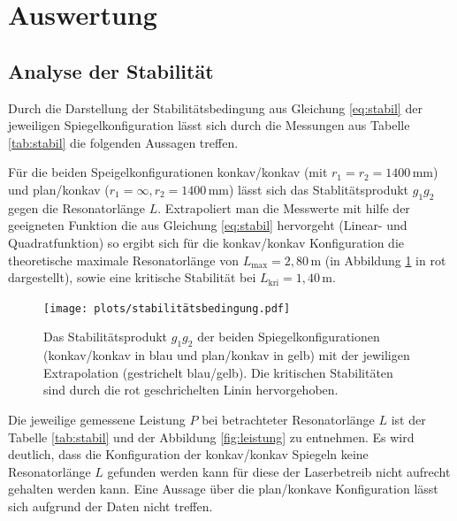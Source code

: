 \section{Auswertung}
\subsection{Analyse der Stabilität}
Durch die Darstellung der Stabilitätsbedingung aus Gleichung \ref{eq:stabil} der jeweiligen Spiegelkonfiguration
lässt sich durch die Messungen aus Tabelle \ref{tab:stabil} die folgenden Aussagen treffen.

Für die beiden Speigelkonfigurationen konkav/konkav (mit $r_1=r_2=1400\,$mm) und plan/konkav ($r_1=\infty {,} r_2=1400\,$mm)
lässt sich das Stablitätsprodukt $g_1g_2$ gegen die Resonatorlänge $L$.
Extrapoliert man die Messwerte mit hilfe der geeigneten Funktion die aus Gleichung \ref{eq:stabil} hervorgeht (Linear- und Quadratfunktion)
so ergibt sich für die konkav/konkav Konfiguration die theoretische maximale Resonatorlänge von $L_{\text{max}}=2,80\,$m (in Abbildung \ref{fig:stabil} in rot dargestellt), 
sowie eine kritische Stabilität bei $L_{\text{kri}}=1,40\,$m. 

\begin{figure}[H]
    \center
    \texttt{[image: plots/stabilitätsbedingung.pdf]}
    \caption{Das Stabilitätsprodukt $g_1g_2$ der beiden Spiegelkonfigurationen (konkav/konkav in blau und plan/konkav in gelb) mit der jewiligen Extrapolation (gestrichelt blau/gelb).
    Die kritischen Stabilitäten sind durch die rot geschrichelten Linin hervorgehoben.}
    \label{fig:stabil}
\end{figure}
\label{sec:Auswertung}

Die jeweilige gemessene Leistung $P$ bei betrachteter Resonatorlänge $L$ ist der Tabelle \ref{tab:stabil} und 
der Abbildung \ref{fig:leistung} zu entnehmen. Es wird deutlich, dass die Konfiguration der konkav/konkav Spiegeln keine Resonatorlänge $L$ gefunden 
werden kann für diese der Laserbetreib nicht aufrecht gehalten werden kann. Eine Aussage über die plan/konkave Konfiguration 
lässt sich aufgrund der Daten nicht treffen.

